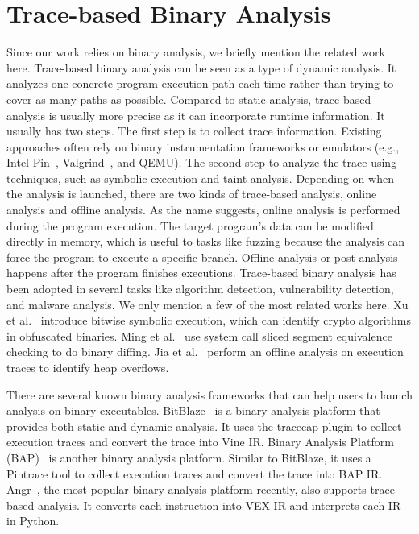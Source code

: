 \section{Trace-based Binary Analysis}
Since our work relies on binary analysis, we briefly mention the related work here.
Trace-based binary analysis can be seen as a type of dynamic analysis. It analyzes one concrete program execution path each time rather than trying to cover
as many paths as possible. Compared to static analysis, trace-based analysis
is usually more precise as it can incorporate runtime information. It usually has
two steps. The first step is to collect trace information. Existing
approaches often rely on binary instrumentation frameworks or emulators (e.g., Intel Pin~\cite{luk2005pin},
Valgrind~\cite{nethercote2007valgrind}, and QEMU). The second step to analyze the trace using techniques, such
as symbolic execution and taint analysis. Depending on when the analysis is launched,
there are two kinds of trace-based analysis, online analysis and offline analysis. As the name suggests, online analysis is performed during the program execution. The target program's data can be modified directly in memory, which is useful to tasks like fuzzing because the analysis
can force the program to execute a specific branch. 
Offline analysis or post-analysis happens after the program finishes executions. 
Trace-based binary analysis has been adopted in several tasks like algorithm
detection, vulnerability detection, and malware analysis. We only mention a few of
the most related works here. Xu et al.~\cite{xu2017cryptographic} introduce bitwise symbolic execution, which can
identify crypto algorithms in obfuscated binaries. Ming et al.~\cite{ming2017binsim} use system call sliced segment equivalence checking to do binary diffing. Jia et al.~\cite{jia2017towards}
perform an offline analysis on execution traces to identify heap overflows.

There are several known binary analysis frameworks that can help users to launch analysis on binary executables. BitBlaze~\cite{brumley2011bap} is a binary analysis platform that provides both static and dynamic analysis. It uses the tracecap plugin to collect execution traces and convert the trace into Vine IR. Binary Analysis Platform (BAP)~\cite{10.1007/978-3-642-22110-1_37}
is another binary analysis platform. Similar to BitBlaze, it uses a Pintrace tool to
collect execution traces and convert the trace into BAP IR. Angr~\cite{shoshitaishvili2016state}, the most popular
binary analysis platform recently, also supports trace-based analysis. It converts each instruction into VEX IR and interprets each IR in Python. 

